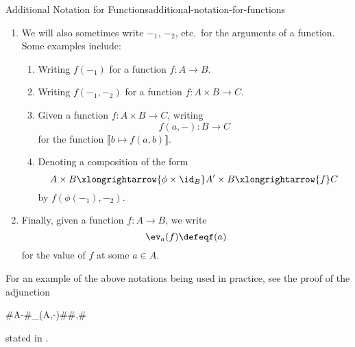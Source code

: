 \begin{notation}{Additional Notation for Functions}{additional-notation-for-functions}
\begin{enumerate}
\begin{enumerate}
\begin{enumerate}
                    \end{enumerate}
                \item Function evaluations, cf.:
                    \begin{enumerate}
                        \item $\Phi(\llbracket x\mapsto f(x)\rrbracket)$%
                        \item $\Phi((x\mapsto f(x)))$%
                        \item $\Phi((\lambda x.\ f(x)))$%
                    \end{enumerate}
            \end{enumerate}
        \item\label{additional-notation-for-functions-3}We will also sometimes write $-_{1}$, $-_{2}$, etc.\ for the arguments of a function. Some examples include:
            \begin{enumerate}
                \item Writing $f(-_{1})$ for a function $f\colon A\to B$.
                \item Writing $f(-_{1},-_{2})$ for a function $f\colon A\times B\to C$.
                \item Given a function $f\colon A\times B\to C$, writing
                    \[
                        f(a,-)%
                        \colon%
                        B%
                        \to%
                        C%
                    \]%
                    for the function $\llbracket b\mapsto f(a,b)\rrbracket$.
                \item Denoting a composition of the form%
                    \[
                        A\times B%
                        \xlongrightarrow{\phi\times\id_{B}}%
                        A'\times B%
                        \xlongrightarrow{f}%
                        C%
                    \]%
                    by $f(\phi(-_{1}),-_{2})$.
            \end{enumerate}
        \item\label{additional-notation-for-functions-4}Finally, given a function $f\colon A\to B$, we write
            \[
                \ev_{a}(f)%
                \defeq%
                f(a)%
            \]%
            for the value of $f$ at some $a\in A$.
    \end{enumerate}
    For an example of the above notations being used in practice, see the proof of the adjunction
    \begin{webcompile}
        \AdjunctionShort#A\times -#{\Hom_{\Sets}(A,-)}#\Sets#\Sets,#
    \end{webcompile}
    stated in .
\end{notation}
